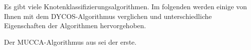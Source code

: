 Es gibt viele Knotenklassifizierungsalgorithmen. Im folgenden
werden einige von Ihnen mit dem DYCOS-Algorithmus verglichen und
unterschiedliche Eigenschaften der Algorithmen hervorgehoben.

Der MUCCA-Algorithmus aus \cite{zappella} sei der erste.

